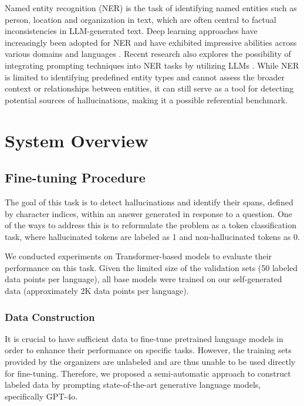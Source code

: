 \documentclass[11pt]{article}
\begin{document}
Named entity recognition (NER) \cite{yadav2019survey} is the task of identifying named entities such as person, location and organization in text,  which are often central to factual inconsistencies in LLM-generated text. Deep learning approaches have increasingly been adopted for NER and have exhibited impressive abilities across various domains and languages \cite{li2020survey, song2021deep, liu2022chinese}. Recent research also explores the possibility of integrating prompting techniques into NER tasks by utilizing LLMs \cite{shen2023promptner, hu2024improving}. While NER is limited to identifying predefined entity types and cannot assess the broader context or relationships between entities, it can still serve as a tool for detecting potential sources of hallucinations, making it a possible referential benchmark.

\section{System Overview}

\subsection{Fine-tuning Procedure}
The goal of this task is to detect hallucinations and identify their spans, defined by character indices, within an answer generated in response to a question. One of the ways to address this is to reformulate the problem as a token classification task, where hallucinated tokens are labeled as 1 and non-hallucinated tokens as 0.

We conducted experiments on Transformer-based models to evaluate their performance on this task. Given the limited size of the validation sets (50 labeled data points per language), all base models were trained on our self-generated data (approximately 2K data points per language).

\subsubsection{Data Construction}
It is crucial to have sufficient data to fine-tune pretrained language models in order to enhance their performance on specific tasks. However, the training sets provided by the organizers are unlabeled and are thus unable to be used directly for fine-tuning. Therefore, we proposed a semi-automatic approach to construct labeled data by prompting state-of-the-art generative language models, specifically GPT-4o.
\end{document}
